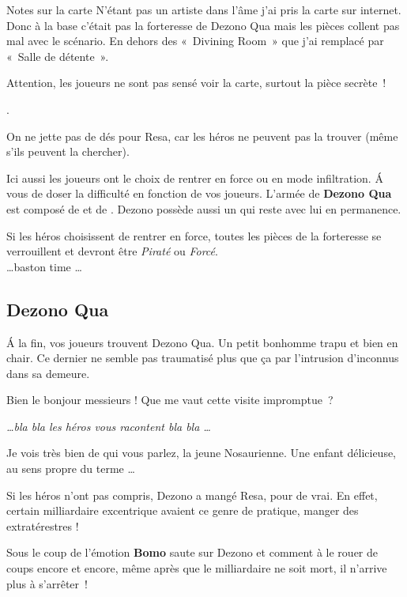 \documentclass{jdrp}
\begin{document}
	\begin{paperbox}{Notes sur la carte}
	N'étant pas un artiste dans l’âme j’ai pris la carte sur internet. Donc à la base c’était pas la forteresse de Dezono Qua mais les pièces collent pas mal avec le scénario. En dehors des «~Divining Room~» que j’ai remplacé par «~Salle de détente~».

	Attention, les joueurs ne sont pas sensé voir la carte, surtout la pièce secrète~!

	\cite{sirinkman-deviantart}.
	\end{paperbox}

	On ne jette pas de dés pour Resa, car les héros ne peuvent pas la trouver (même s’ils peuvent la chercher). 

	Ici aussi les joueurs ont le choix de rentrer en force ou en mode infiltration. \'A vous de doser la difficulté en fonction de vos joueurs. L’armée de \textbf{Dezono Qua} est composé de  et de . Dezono possède aussi un  qui reste avec lui en permanence.

	Si les héros choisissent de rentrer en force, toutes les pièces de la forteresse se verrouillent et devront être \textit{Piraté} ou \textit{Forcé}.\\

	\ldots baston time \ldots \\

	\subsection{Dezono Qua}
	\'A la fin, vos joueurs trouvent Dezono Qua. Un petit bonhomme trapu et bien en chair. Ce dernier ne semble pas traumatisé plus que ça par l’intrusion d’inconnus dans sa demeure.

	\begin{quotebox}
    	Bien le bonjour messieurs ! Que me vaut cette visite impromptue~?

    	\textit{\ldots bla bla les héros vous racontent bla bla \ldots}

    	Je vois très bien de qui vous parlez, la jeune Nosaurienne. Une enfant délicieuse, au sens propre du terme \ldots
	\end{quotebox}

	Si les héros n'ont pas compris, Dezono a mangé Resa, pour de vrai. En effet, certain milliardaire excentrique avaient ce genre de pratique, manger des extratérestres !

	Sous le coup de l’émotion \textbf{Bomo} saute sur Dezono et comment à le rouer de coups encore et encore, même après que le milliardaire ne soit mort, il n’arrive plus à s’arrêter~!
\end{document}
